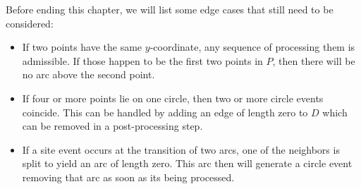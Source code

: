         Before ending this chapter, we will list some edge cases that still need to be considered: 
        \begin{itemize}[itemsep=-3pt]
            \item If two points have the same $y$-coordinate, any sequence of processing them is admissible. If those happen to be the first two points in $P$, then there will be no arc above the second point. 
            
            \item If four or more points lie on one circle, then two or more circle events coincide. This can be handled by adding an edge of length zero to $D$ which can be removed in a post-processing step.
            
            \item If a site event occurs at the transition of two arcs, one of the neighbors is split to yield an arc of length zero. This arc then will generate a circle event removing that arc as soon as its being processed.
        \end{itemize}